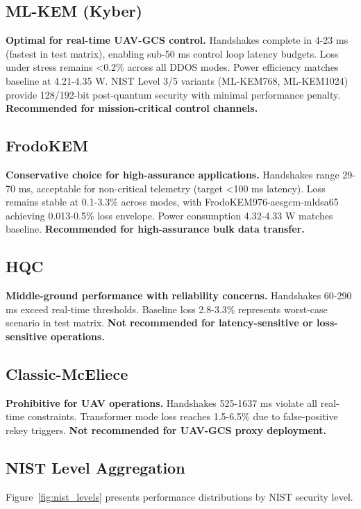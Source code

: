 \documentclass[11pt,a4paper]{article}
\begin{document}
\subsection{ML-KEM (Kyber)}
\textbf{Optimal for real-time UAV-GCS control.} Handshakes complete in 4-23 ms (fastest in test matrix), enabling sub-50 ms control loop latency budgets. Loss under stress remains <0.2\% across all DDOS modes. Power efficiency matches baseline at 4.21-4.35 W. NIST Level 3/5 variants (ML-KEM768, ML-KEM1024) provide 128/192-bit post-quantum security with minimal performance penalty. \textbf{Recommended for mission-critical control channels.}

\subsection{FrodoKEM}
\textbf{Conservative choice for high-assurance applications.} Handshakes range 29-70 ms, acceptable for non-critical telemetry (target <100 ms latency). Loss remains stable at 0.1-3.3\% across modes, with FrodoKEM976-aesgcm-mldsa65 achieving 0.013-0.5\% loss envelope. Power consumption 4.32-4.33 W matches baseline. \textbf{Recommended for high-assurance bulk data transfer.}

\subsection{HQC}
\textbf{Middle-ground performance with reliability concerns.} Handshakes 60-290 ms exceed real-time thresholds. Baseline loss 2.8-3.3\% represents worst-case scenario in test matrix. \textbf{Not recommended for latency-sensitive or loss-sensitive operations.}

\subsection{Classic-McEliece}
\textbf{Prohibitive for UAV operations.} Handshakes 525-1637 ms violate all real-time constraints. Transformer mode loss reaches 1.5-6.5\% due to false-positive rekey triggers. \textbf{Not recommended for UAV-GCS proxy deployment.}

\subsection{NIST Level Aggregation}

Figure~\ref{fig:nist_levels} presents performance distributions by NIST security level.
\end{document}
